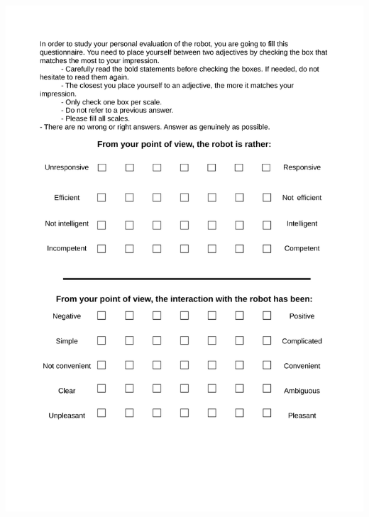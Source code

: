 \begin{center}
	\includegraphics[page=2, width=\textwidth]{figures/annexe1/perdita_translation_en_thesis.pdf} 
\end{center}

